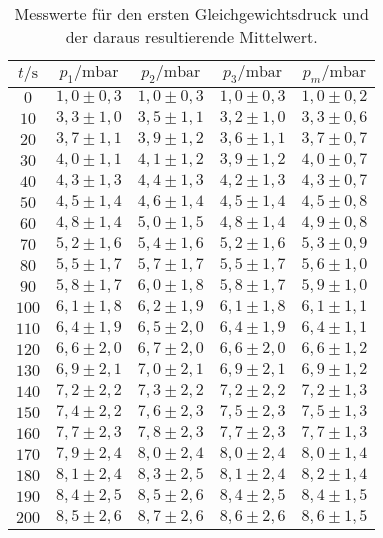 \begin{table}[H]
  \centering
  \caption{Messwerte für den ersten Gleichgewichtsdruck und der daraus resultierende Mittelwert.}
  \label{tab:pm}
  \begin{tabular}{c c c c c}
    \toprule
  $t/\si{\second}$ & $p_1 /\si{\milli\bar}$ & $p_2 /\si{\milli\bar}$ & $p_3 /\si{\milli\bar}$ & $p_m /\si{\milli\bar}$ \\
    \midrule
    $  0$ & $ 1,0 \pm 0,3 $ & $ 1,0 \pm 0,3 $ & $ 1,0 \pm 0,3 $& $ 1,0 \pm 0,2 $ \\ 
    $ 10$ & $ 3,3 \pm 1,0 $ & $ 3,5 \pm 1,1 $ & $ 3,2 \pm 1,0 $& $ 3,3 \pm 0,6 $ \\ 
    $ 20$ & $ 3,7 \pm 1,1 $ & $ 3,9 \pm 1,2 $ & $ 3,6 \pm 1,1 $& $ 3,7 \pm 0,7 $ \\ 
    $ 30$ & $ 4,0 \pm 1,1 $ & $ 4,1 \pm 1,2 $ & $ 3,9 \pm 1,2 $& $ 4,0 \pm 0,7 $ \\ 
    $ 40$ & $ 4,3 \pm 1,3 $ & $ 4,4 \pm 1,3 $ & $ 4,2 \pm 1,3 $& $ 4,3 \pm 0,7 $ \\ 
    $ 50$ & $ 4,5 \pm 1,4 $ & $ 4,6 \pm 1,4 $ & $ 4,5 \pm 1,4 $& $ 4,5 \pm 0,8 $ \\ 
    $ 60$ & $ 4,8 \pm 1,4 $ & $ 5,0 \pm 1,5 $ & $ 4,8 \pm 1,4 $& $ 4,9 \pm 0,8 $ \\ 
    $ 70$ & $ 5,2 \pm 1,6 $ & $ 5,4 \pm 1,6 $ & $ 5,2 \pm 1,6 $& $ 5,3 \pm 0,9 $ \\ 
    $ 80$ & $ 5,5 \pm 1,7 $ & $ 5,7 \pm 1,7 $ & $ 5,5 \pm 1,7 $& $ 5,6 \pm 1,0 $ \\ 
    $ 90$ & $ 5,8 \pm 1,7 $ & $ 6,0 \pm 1,8 $ & $ 5,8 \pm 1,7 $& $ 5,9 \pm 1,0 $ \\ 
    $100$ & $ 6,1 \pm 1,8 $ & $ 6,2 \pm 1,9 $ & $ 6,1 \pm 1,8 $& $ 6,1 \pm 1,1 $ \\ 
    $110$ & $ 6,4 \pm 1,9 $ & $ 6,5 \pm 2,0 $ & $ 6,4 \pm 1,9 $& $ 6,4 \pm 1,1 $ \\ 
    $120$ & $ 6,6 \pm 2,0 $ & $ 6,7 \pm 2,0 $ & $ 6,6 \pm 2,0 $& $ 6,6 \pm 1,2 $ \\ 
    $130$ & $ 6,9 \pm 2,1 $ & $ 7,0 \pm 2,1 $ & $ 6,9 \pm 2,1 $& $ 6,9 \pm 1,2 $ \\ 
    $140$ & $ 7,2 \pm 2,2 $ & $ 7,3 \pm 2,2 $ & $ 7,2 \pm 2,2 $& $ 7,2 \pm 1,3 $ \\ 
    $150$ & $ 7,4 \pm 2,2 $ & $ 7,6 \pm 2,3 $ & $ 7,5 \pm 2,3 $& $ 7,5 \pm 1,3 $ \\ 
    $160$ & $ 7,7 \pm 2,3 $ & $ 7,8 \pm 2,3 $ & $ 7,7 \pm 2,3 $& $ 7,7 \pm 1,3 $ \\ 
    $170$ & $ 7,9 \pm 2,4 $ & $ 8,0 \pm 2,4 $ & $ 8,0 \pm 2,4 $& $ 8,0 \pm 1,4 $ \\ 
    $180$ & $ 8,1 \pm 2,4 $ & $ 8,3 \pm 2,5 $ & $ 8,1 \pm 2,4 $& $ 8,2 \pm 1,4 $ \\ 
    $190$ & $ 8,4 \pm 2,5 $ & $ 8,5 \pm 2,6 $ & $ 8,4 \pm 2,5 $& $ 8,4 \pm 1,5 $ \\ 
    $200$ & $ 8,5 \pm 2,6 $ & $ 8,7 \pm 2,6 $ & $ 8,6 \pm 2,6 $& $ 8,6 \pm 1,5 $ \\ 
    \bottomrule
  \end{tabular}
\end{table}

